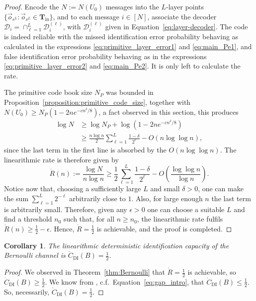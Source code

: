 \documentclass[10pt, conference]{IEEEtran}
\newtheorem{corollary}[theorem]{Corollary}
\newcommand{\1}{\mathds{1}}
\newcommand{\cD}{\mathcal{D}}
\begin{document}
\begin{proof}
Encode the $N:=N(U_0)$ messages into the $L$-layer points $\{\vec o_{s^L}:\vec o_{s^L}\in\mathbf{T}_\text{in}\}$, and to each message $i\in [N]$, associate the decoder $\cD_i=\cap_{\ell=1}^L\cD_i^{(\ell)}$, with $\cD_i^{(\ell)}$ given in Equation~\eqref{eq:layer-decoder}. The code is indeed reliable with the missed identification error probability behaving as calculated in the expressions \eqref{eq:primitive_layer_error1} and \eqref{eq:main_Pe1}, and false identification error probability behaving as in the expressions \eqref{eq:primitive_layer_error2} and \eqref{eq:main_Pe2}. It is only left to calculate the rate. 

The primitive code book size $N_P$ was bounded in Proposition~\ref{proposition:primitive_code_size}, together with $N(U_0)\geq N_P\left(1-2ne^{-cn^\delta/8}\right)$, a fact observed in this section, this produces
\begin{align}
\log N&\geq\log N_P+\log\left(1-2ne^{-cn^\delta/8}\right)\nonumber\\
&\geq \frac{n\log n}{2}\sum_{\ell=1}^L\frac{1-\delta}{2^\ell}-O(n\log\log n)\label{eq:size_step},
\end{align}
since the last term in the first line is absorbed by the $O(n\log\log n)$. The linearithmic rate is therefore given by
\begin{equation}\label{eq:linearithmic_rate}
\dot R(n):=\frac{\log N}{n\log n}\geq
\frac{1}{2}\sum_{\ell=1}^L\frac{1-\delta}{2^\ell}-O\left(\frac{\log\log n}{\log n}\right).
\end{equation}
Notice now that, choosing a sufficiently large $L$ and small $\delta>0$, one can make the sum $\sum_{\ell=1}^L{2^{-\ell}}$ arbitrarily close to $1$. Also, for large enough $n$ the last term is arbitrarily small. Therefore, given any $\epsilon>0$ one can choose a suitable $L$ and find a threshold $n_0$ such that, for all $n\ge n_0$, the linearithmic rate fulfils $\dot R(n)\geq\frac12-\epsilon$. Hence, $\dot R=\frac12$ is achievable, and the proof is completed.
\end{proof}

\begin{corollary}\label{cor:capacity}
The linearithmic deterministic identification capacity of the Bernoulli channel is $\dot C_\text{DI}(B)=\frac12$.
\end{corollary}
\begin{proof}
We observed in Theorem~\ref{thm:Bernoulli} that $\dot R=\frac12$ is achievable, so $\dot{C}_\text{DI}(B)\geq\frac12$. We know from \cite{CDBW:DI_classical}, c.f.~Equation~\eqref{eq:gap_intro}, that $\dot{C}_\text{DI}(B)\leq\frac12$. So, necessarily, $\dot{C}_\text{DI}(B)=\frac12$. 
\end{proof}
\end{document}
